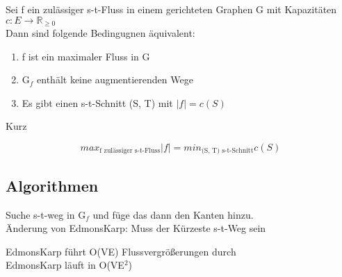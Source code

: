 \documentclass[14pt]{article}
\begin{document}
\begin{definition}
    Sei f ein zulässiger s-t-Fluss in einem gerichteten Graphen
    G mit Kapazitäten $c : E \rightarrow \mathbb{R}_{\geq 0}$ \\
    Dann sind folgende Bedingugnen äquivalent:
    \begin{enumerate}
        \item f ist ein maximaler Fluss in G
        \item G$_f$ enthält keine augmentierenden Wege
        \item Es gibt einen s-t-Schnitt (S, T) mit $|f| = c(S)$
    \end{enumerate}
    Kurz \\
    \begin{centering}
        \[
            max_{\text{f zulässiger s-t-Fluss}} |f|
            = min_{\text{(S, T) s-t-Schnitt}} c(S)
        \]
    \end{centering}
\end{definition}

\subsection{Algorithmen}
\begin{definition}
    Suche s-t-weg in G$_f$ und füge das dann den
    Kanten hinzu. \\
    Änderung von EdmonsKarp: Muss der Kürzeste s-t-Weg sein
\end{definition}
EdmonsKarp führt O(VE) Flussvergrößerungen durch \\
EdmonsKarp läuft in O(VE$^2$)
\end{document}
